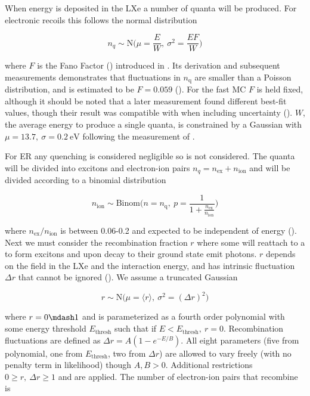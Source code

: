 When energy is deposited in the LXe a number of quanta will be produced.  For electronic recoils this follows the normal distribution

\begin{equation}
n_q \sim \mathrm{N} \bigg( \mu = \frac{E}{W},\ \sigma^2 = \frac{E F}{W} \bigg)
\end{equation}

\noindent where $F$ is the Fano Factor () introduced in .  Its derivation and subsequent measurements
demonstrates
that fluctuations in $n_{\mathrm{q}}$ are smaller than a Poisson distribution, and is estimated to be $F = 0.059$ ().  For the
fast MC $F$ is held fixed, although it should be noted that a later measurement found different best-fit values, though their result was
compatible with  when including uncertainty ().  $W$, the average energy to produce a single
quanta, is constrained by a Gaussian with $\mu = 13.7,\ \sigma = 0.2\ \mathrm{eV}$ following the measurement of .

For ER any quenching is considered negligible so is not considered.  The quanta will be divided into excitons and electron-ion pairs
$n_q = n_{\mathrm{ex}} + n_{\mathrm{ion}}$ and will be divided according to a binomial distribution

\begin{equation}
n_{\mathrm{ion}} \sim \mathrm{Binom} \Bigg(n = n_{\mathrm{q}},\ p = \frac{1}{1 + \frac{n_{\mathrm{ex}}}{n_{\mathrm{ion}}}} \Bigg)
\label{eq:er_nr_calibrations_parameter_determ_er_nions}
\end{equation}

\noindent where $n_{\mathrm{ex}} / n_{\mathrm{ion}}$ is between 0.06-0.2 and expected to be independent of energy
().  Next we must consider the recombination fraction $r$ where some \electron will reattach to a  to form
excitons and upon decay to their ground state emit photons.  $r$ depends on the field in the LXe and the interaction energy, and has
intrinsic fluctuation $\Delta r$ that cannot be ignored ().  We assume a truncated Gaussian

\begin{equation}
r \sim \mathrm{N} \Big( \mu = \langle r \rangle,\ \sigma^2 = (\Delta r)^2 \Big)
\end{equation}

\noindent where $r = 0 \mdash 1$ and is parameterized as a fourth order polynomial with some energy threshold
$E_{\mathrm{thresh}}$ such that if $E < E_{\mathrm{thresh}},\ r = 0$.  Recombination fluctuations are defined as
$\Delta r = A(1 - e^{-E/B})$.  All eight parameters (five from polynomial, one from $E_{\mathrm{thresh}}$, two from $\Delta r$) are allowed
to vary freely (with no penalty term in likelihood) though $A,B > 0$.  Additional restrictions $0 \geq r,\ \Delta r \geq 1$ and
are applied.  The number of electron-ion pairs that recombine is

